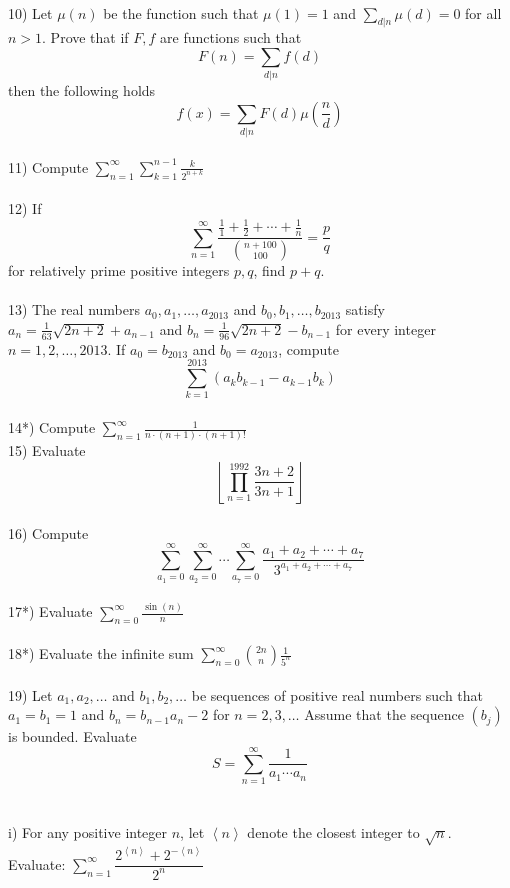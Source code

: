 \documentclass{article}
\begin{document}
\\
10) Let $\mu(n)$ be the function such that $\mu(1)=1$ and $\displaystyle\sum_{d|n}\mu(d)=0$ for all $n>1$. Prove that if $F,f$ are functions such that
\begin{equation*}
F(n)=\sum_{d|n}f(d)
\end{equation*}
then the following holds
\begin{equation*}
f(x)=\displaystyle\sum_{d|n} F(d)\mu(\frac{n}{d})
\end{equation*}
\\
11) Compute $\displaystyle\sum_{n=1}^{\infty}\displaystyle\sum_{k=1}^{n-1}\displaystyle\frac{k}{2^{n+k}}$
\\
\\
12) If
\begin{equation*}
\sum_{n=1}^{\infty} \frac{\frac{1}{1}+\frac{1}{2}+\cdots+\frac{1}{n}}{\binom{n+100}{100}}=\frac{p}{q}
\end{equation*}
for relatively prime positive integers $p,q$, find $p+q$.
\\
\\
13) The real numbers $a_0,a_1,\ldots,a_{2013}$ and $b_0,b_1,\ldots,b_{2013}$ satisfy $a_n=\frac{1}{63}\sqrt{2n+2}+a_{n-1}$ and $b_n=\frac{1}{96}\sqrt{2n+2}-b_{n-1}$ for every integer $n=1,2,\ldots,2013$. If $a_0=b_{2013}$ and $b_0=a_{2013}$, compute
\begin{equation*}
\sum_{k=1}^{2013} (a_kb_{k-1}-a_{k-1}b_k)
\end{equation*}
\\
14*) Compute $\displaystyle\sum_{n=1}^{\infty} \frac{1}{n\cdot(n+1)\cdot(n+1)!}$
\\
15) Evaluate 
\begin{equation*}
\left \lfloor \displaystyle\prod_{n=1}^{1992}\frac{3n+2}{3n+1} \right \rfloor
\end{equation*}
\\
16) Compute
\begin{equation*}
\sum_{a_1=0}^{\infty}\sum_{a_2=0}^{\infty}\cdots\sum_{a_7=0}^{\infty} \frac{a_1+a_2+\cdots+a_7}{3^{a_1+a_2+\cdots+a_7}}
\end{equation*}
\\
17*) Evaluate $\displaystyle\sum_{n=0}^{\infty}\frac{\sin(n)}{n}$
\\
\\
18*) Evaluate the infinite sum $\displaystyle\sum_{n=0}^{\infty} \binom{2n}{n}\frac{1}{5^n}$
\\
\\
19) Let $a_1,a_2,\ldots$ and $b_1,b_2,\ldots$ be sequences of positive real numbers such that $a_1=b_1=1$ and $b_n=b_{n-1}a_n-2$ for $n=2,3,\ldots$ Assume that the sequence $(b_j)$ is bounded. Evaluate
\begin{equation*}
S=\sum_{n=1}^{\infty} \frac{1}{a_1\cdots a_n}
\end{equation*}
\\
\\
i) For any positive integer $n$, let $\left< n \right>$ denote the closest integer to $\sqrt {n}$. Evaluate: $\displaystyle\sum_{n=1}^{\infty} \dfrac {2^{\left< n \right>} + 2^{- \left< n \right>}}{2^n}$
\end{document}
